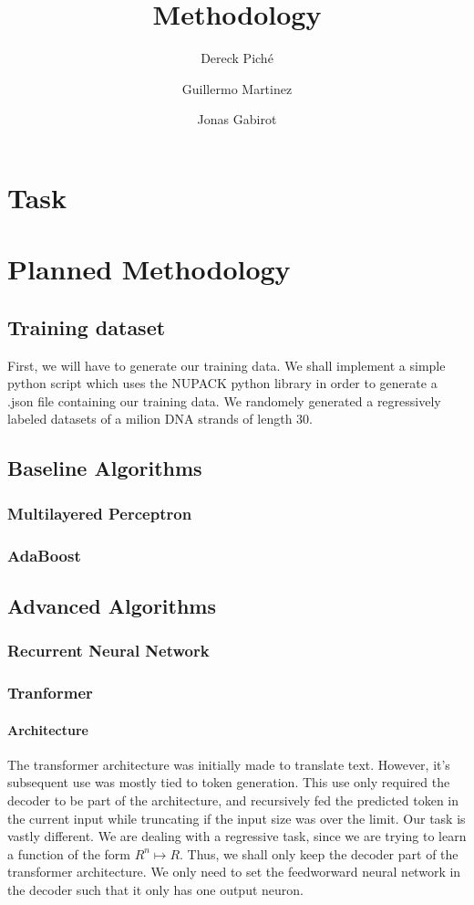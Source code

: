 \documentclass{article}
\title{Methodology}
\author
{
    Dereck Piché \and
    Guillermo Martinez \and
    Jonas Gabirot \and
}
\begin{document}
\maketitle

\section{Task}


\section{Planned Methodology}
\subsection{Training dataset}
First, we will have to generate our training data. We shall implement a 
simple python script which uses the NUPACK python library in order
to generate a .json file containing our training data. We randomely 
generated a regressively labeled datasets of a milion DNA strands of length $30$.
\subsection{Baseline Algorithms}

\subsubsection{Multilayered Perceptron}

\subsubsection{AdaBoost}


\subsection{Advanced Algorithms}

\subsubsection{Recurrent Neural Network}

\subsubsection{Tranformer}
\paragraph{Architecture}
The transformer architecture was initially made to translate text.
However, it's subsequent use was mostly tied to token generation. 
This use only required the decoder to be part of the architecture, 
and recursively fed the predicted token in the current input while 
truncating if the input size was over the limit.
Our task is vastly different. We are dealing with a regressive task,
since we are trying to learn a function of the form $R^n \mapsto R$.
Thus, we shall only keep the decoder part of the transformer architecture. 
We only need to set the feedworward neural network in the decoder such that 
it only has one output neuron.
\end{document}
